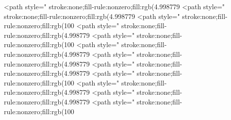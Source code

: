 <path style=" stroke:none;fill-rule:nonzero;fill:rgb(4.998779%
<path style=" stroke:none;fill-rule:nonzero;fill:rgb(4.998779%
<path style=" stroke:none;fill-rule:nonzero;fill:rgb(100%
<path style=" stroke:none;fill-rule:nonzero;fill:rgb(4.998779%
<path style=" stroke:none;fill-rule:nonzero;fill:rgb(100%
<path style=" stroke:none;fill-rule:nonzero;fill:rgb(4.998779%
<path style=" stroke:none;fill-rule:nonzero;fill:rgb(4.998779%
<path style=" stroke:none;fill-rule:nonzero;fill:rgb(4.998779%
<path style=" stroke:none;fill-rule:nonzero;fill:rgb(100%
<path style=" stroke:none;fill-rule:nonzero;fill:rgb(4.998779%
<path style=" stroke:none;fill-rule:nonzero;fill:rgb(4.998779%
<path style=" stroke:none;fill-rule:nonzero;fill:rgb(100%
